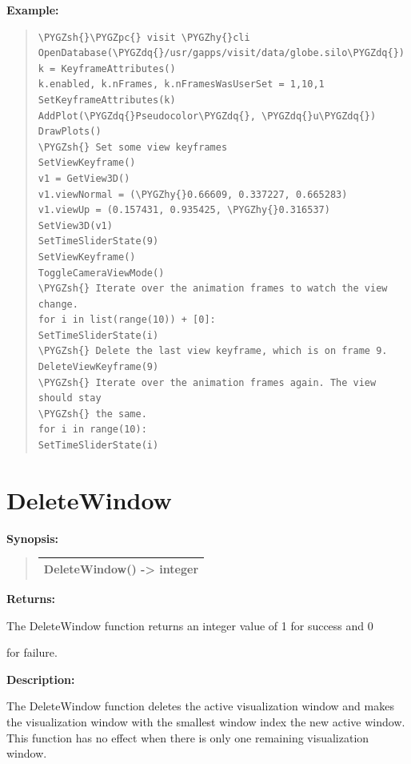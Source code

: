 \documentclass[letterpaper,10pt,english]{sphinxmanual}
\def\PYGZsh{\char`\#}
\def\PYGZpc{\char`\%}
\def\PYGZhy{\char`\-}
\def\PYGZdq{\char`\"}
\begin{document}
\begin{DUlineblock}{0em}
\item[] \textbf{Example:}
\item[] 
\end{DUlineblock}
\begin{quote}

\begin{Verbatim}[commandchars=\\\{\}]
\PYGZsh{}\PYGZpc{} visit \PYGZhy{}cli
OpenDatabase(\PYGZdq{}/usr/gapps/visit/data/globe.silo\PYGZdq{})
k = KeyframeAttributes()
k.enabled, k.nFrames, k.nFramesWasUserSet = 1,10,1
SetKeyframeAttributes(k)
AddPlot(\PYGZdq{}Pseudocolor\PYGZdq{}, \PYGZdq{}u\PYGZdq{})
DrawPlots()
\PYGZsh{} Set some view keyframes
SetViewKeyframe()
v1 = GetView3D()
v1.viewNormal = (\PYGZhy{}0.66609, 0.337227, 0.665283)
v1.viewUp = (0.157431, 0.935425, \PYGZhy{}0.316537)
SetView3D(v1)
SetTimeSliderState(9)
SetViewKeyframe()
ToggleCameraViewMode()
\PYGZsh{} Iterate over the animation frames to watch the view change.
for i in list(range(10)) + [0]:
SetTimeSliderState(i)
\PYGZsh{} Delete the last view keyframe, which is on frame 9.
DeleteViewKeyframe(9)
\PYGZsh{} Iterate over the animation frames again. The view should stay
\PYGZsh{} the same.
for i in range(10):
SetTimeSliderState(i)
\end{Verbatim}
\end{quote}


\section{DeleteWindow}
\label{functions:deletewindow}
\begin{DUlineblock}{0em}
\item[] \textbf{Synopsis:}
\end{DUlineblock}
\begin{quote}

\begin{tabulary}{\linewidth}{|L|}
\hline

DeleteWindow() -\textgreater{} integer
\\
\hline\end{tabulary}

\end{quote}

\begin{DUlineblock}{0em}
\item[] 
\item[] \textbf{Returns:}
\item[] The DeleteWindow function returns an integer value of 1 for success and 0
\item[] for failure.
\item[] 
\item[] \textbf{Description:}
\item[] The DeleteWindow function deletes the active visualization window and
makes the visualization window with the smallest window index the new
active window. This function has no effect when there is only one remaining
visualization window.
\end{DUlineblock}
\end{document}
